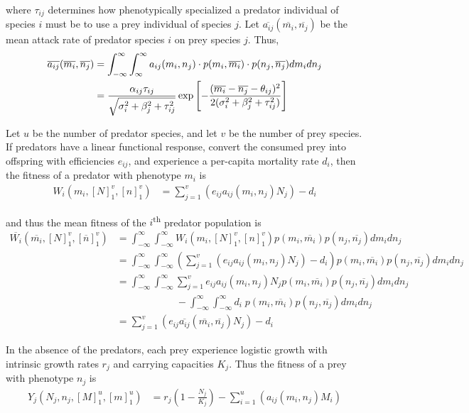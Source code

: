 \documentclass[12pt]{article}
\begin{document}
\noindent where $\tau_{ij}$ determines how phenotypically specialized a predator individual of species $i$ must be to use a prey individual of species $j$.  Let $\overline{a_{ij}}(\overline{m_i}, \overline{n_j})$ be the mean attack rate of predator species $i$ on prey species $j$.  Thus,
\begin{align*}
	\overline{a_{ij}}(\overline{m_i}, \overline{n_j}) &= \int_{-\infty}^{\infty}\int_{\-\infty}^{\infty} a_{ij}(m_i, n_j) \cdot p(m_i, \overline{m_i}) \cdot p(n_j, \overline{n_j}) dm_i dn_j \\
	&= \frac{\alpha_{ij}\tau_{ij}}{\sqrt{\sigma_i^2 + \beta_j^2 + \tau_{ij}^2}}\exp\left[{-\frac{(\overline{m_i} - \overline{n_j} - \theta_{ij})^2}{2(\sigma_i^2 + \beta_j^2 + \tau_{ij}^2)}}\right]
\end{align*}

\noindent Let $u$ be the number of predator species, and let $v$ be the number of prey species.  If predators have a linear functional response, convert the consumed prey into offspring with efficiencies $e_{ij}$, and experience a per-capita mortality rate $d_i$, then the fitness of a predator with phenotype $m_i$ is
\begin{align*}
	W_i(m_i, [N]_1^v, [n]_1^v) &= \sum_{j = 1}^v\left(e_{ij}a_{ij}(m_i, n_j)N_j\right) - d_i
\end{align*}

\noindent and thus the mean fitness of the $i$\textsuperscript{th} predator population is
\begin{align*}
	\overline{W_i}(\overline{m_i}, [N]_1^v, [\overline{n}]_1^v) &= \int_{-\infty}^{\infty}\int_{-\infty}^{\infty} W_i(m_i, [N]_1^v, [n]_1^v) p(m_i, \overline{m_i}) p(n_j, \overline{n_j}) dm_i dn_j \\
	&= \int_{-\infty}^{\infty}\int_{-\infty}^{\infty} \left(\sum_{j = 1}^v\left(e_{ij}a_{ij}(m_i, n_j)N_j\right) - d_i\right) p(m_i, \overline{m_i}) p(n_j, \overline{n_j}) dm_i dn_j \\
	&= \int_{-\infty}^{\infty}\int_{-\infty}^{\infty} \sum_{j = 1}^ve_{ij}a_{ij}(m_i, n_j)N_jp(m_i, \overline{m_i}) p(n_j, \overline{n_j}) dm_i dn_j \\
	&\qquad\qquad\qquad- \int_{-\infty}^{\infty}\int_{-\infty}^{\infty} d_i \;p(m_i, \overline{m_i}) p(n_j, \overline{n_j}) dm_i dn_j \\
	&= \sum_{j=1}^v\left(e_{ij}\overline{a_{ij}}(\overline{m_i}, \overline{n_j})N_j\right) - d_i
\end{align*}

\noindent In the absence of the predators, each prey experience logistic growth with intrinsic growth rates $r_j$ and carrying capacities $K_j$.  Thus the fitness of a prey with phenotype $n_j$ is
\begin{align*}
	Y_j(N_j, n_j, [M]_1^u, [m]_1^u) &= r_j\left(1 - \frac{N_j}{K_j} \right) - \sum_{i = 1}^u\left(a_{ij}(m_i, n_j)M_i\right)
\end{align*}
\end{document}

